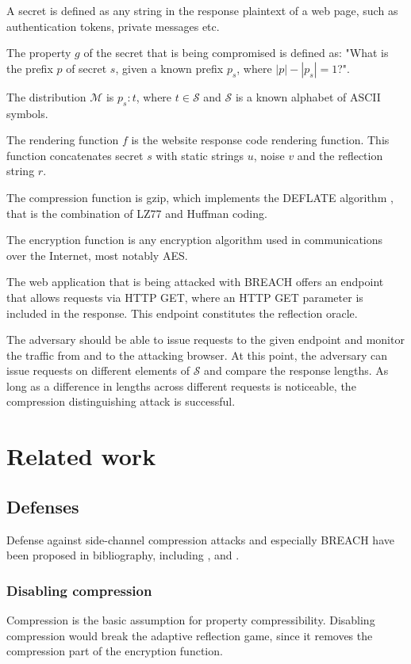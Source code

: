 \documentclass[conference, letterpaper, 10pt]{IEEEtran}
\begin{document}
A secret is defined as any string in the response plaintext of a web page, such
as authentication tokens, private messages etc.

The property $g$ of the secret that is being compromised is defined as: "What is
the prefix $p$ of secret $s$, given a known prefix $p_s$, where $|p| - |p_s| =
1$?".

The distribution $\mathcal{M}$ is ${p_s:t}$, where $t \in \mathcal{S}$ and
$\mathcal{S}$ is a known alphabet of ASCII symbols.

The rendering function $f$ is the website response code rendering function. This
function concatenates secret $s$ with static strings $u$, noise $v$ and the
reflection string $r$.

The compression function is gzip, which implements the DEFLATE algorithm
\cite{c12}, that is the combination of LZ77 and Huffman coding.

The encryption function is any encryption algorithm used in communications over
the Internet, most notably AES.

The web application that is being attacked with BREACH offers an endpoint that
allows requests via HTTP GET, where an HTTP GET parameter is included in the
response. This endpoint constitutes the reflection oracle.

The adversary should be able to issue requests to the given endpoint and monitor
the traffic from and to the attacking browser. At this point, the adversary can
issue requests on different elements of $\mathcal{S}$ and compare the response lengths. As
long as a difference in lengths across different requests is noticeable, the
compression distinguishing attack is successful.

\section{Related work}\label{sec:related}

\subsection{Defenses}

Defense against side-channel compression attacks and especially BREACH have been
proposed in bibliography, including \cite{c3}, \cite{c5} and \cite{c6}.

\subsubsection{Disabling compression}\label{subsec:disablecom}
Compression is the basic assumption for property compressibility. Disabling
compression would break the adaptive reflection game, since it removes
the compression part of the encryption function.
\end{document}
